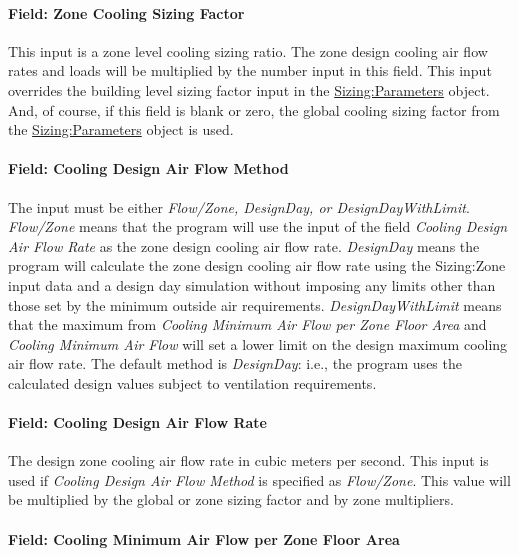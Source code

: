 \paragraph{Field: Zone Cooling Sizing Factor}\label{field-zone-cooling-sizing-factor}

This input is a zone level cooling sizing ratio. The zone design cooling air flow rates and loads will be multiplied by the number input in this field. This input overrides the building level sizing factor input in the \hyperref[sizingparameters]{Sizing:Parameters} object. And, of course, if this field is blank or zero, the global cooling sizing factor from the \hyperref[sizingparameters]{Sizing:Parameters} object is used.

\paragraph{Field: Cooling Design Air Flow Method}\label{field-cooling-design-air-flow-method}

The input must be either \emph{Flow/Zone, DesignDay, or DesignDayWithLimit}. \emph{Flow/Zone} means that the program will use the input of the field \emph{Cooling Design Air Flow Rate} as the zone design cooling air flow rate. \emph{DesignDay} means the program will calculate the zone design cooling air flow rate using the Sizing:Zone input data and a design day simulation without imposing any limits other than those set by the minimum outside air requirements. \emph{DesignDayWithLimit} means that the maximum from \emph{Cooling Minimum Air Flow per Zone Floor Area} and \emph{Cooling Minimum Air Flow} will set a lower limit on the design maximum cooling air flow rate. The default method is \emph{DesignDay}: i.e., the program uses the calculated design values subject to ventilation requirements.

\paragraph{Field: Cooling Design Air Flow Rate}\label{field-cooling-design-air-flow-rate}

The design zone cooling air flow rate in cubic meters per second. This input is used if \emph{Cooling Design Air Flow Method} is specified as \emph{Flow/Zone}. This value will be multiplied by the global or zone sizing factor and by zone multipliers.

\paragraph{Field: Cooling Minimum Air Flow per Zone Floor Area}\label{field-cooling-minimum-air-flow-per-zone-floor-area}

